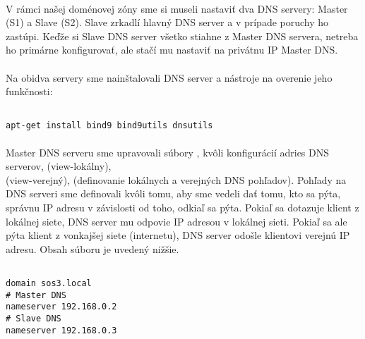 \paragraph{}
V rámci našej doménovej zóny  sme si museli nastaviť dva DNS servery: Master (S1) a Slave (S2). Slave zrkadlí hlavný DNS server a v prípade poruchy ho zastúpi. Keďže si Slave DNS server všetko stiahne z Master DNS servera, netreba ho primárne konfigurovať, ale stačí mu  nastaviť  na privátnu IP Master DNS.
\paragraph{}
Na obidva servery sme nainštalovali DNS server a nástroje na overenie jeho funkčnosti:

\noindent
{\selectfont
\begin{small}
\begin{verbatim}

apt-get install bind9 bind9utils dnsutils

\end{verbatim}
\end{small}
}


\paragraph{}
Master DNS serveru sme upravovali súbory , kvôli konfigurácií adries DNS serverov,  (view-lokálny),\\  (view-verejný),  (definovanie lokálnych a verejných DNS pohľadov). Pohľady na DNS serveri sme definovali kvôli tomu, aby sme vedeli dať tomu, kto sa pýta, správnu IP adresu v závislosti od toho, odkiaľ sa pýta. Pokiaľ sa dotazuje klient z lokálnej siete, DNS server mu odpovie IP adresou v lokálnej sieti. Pokiaľ sa ale pýta klient z vonkajšej siete (internetu), DNS server odošle klientovi verejnú IP adresu. Obsah súboru  je uvedený nižšie.

\noindent
{\selectfont

\begin{small}

\begin{verbatim}

domain sos3.local
# Master DNS
nameserver 192.168.0.2
# Slave DNS
nameserver 192.168.0.3

\end{verbatim}

\end{small}

}

